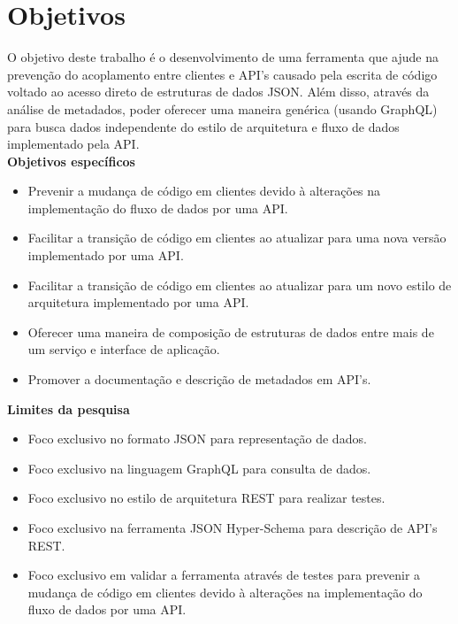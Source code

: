 \section[Objetivos]{Objetivos}

O objetivo deste trabalho é o desenvolvimento de uma ferramenta que ajude na prevenção do acoplamento entre clientes e API's causado pela escrita de código voltado ao acesso direto de estruturas de dados JSON. Além disso, através da análise de metadados, poder oferecer uma maneira genérica (usando GraphQL) para busca dados independente do estilo de arquitetura e fluxo de dados implementado pela API. \\

\textbf{Objetivos específicos} \\

\begin{itemize}
\item Prevenir a mudança de código em clientes devido à alterações na implementação do fluxo de dados por uma API.
\item Facilitar a transição de código em clientes ao atualizar para uma nova versão implementado por uma API.
\item Facilitar a transição de código em clientes ao atualizar para um novo estilo de arquitetura implementado por uma API.
\item Oferecer uma maneira de composição de estruturas de dados entre mais de um serviço e interface de aplicação.
\item Promover a documentação e descrição de metadados em API's. \\
\end{itemize}

\textbf{Limites da pesquisa} \\

\begin{itemize}
\item Foco exclusivo no formato JSON para representação de dados.
\item Foco exclusivo na linguagem GraphQL para consulta de dados.
\item Foco exclusivo no estilo de arquitetura REST para realizar testes.
\item Foco exclusivo na ferramenta JSON Hyper-Schema para descrição de API's REST.
\item Foco exclusivo em validar a ferramenta através de testes para prevenir a mudança de código em clientes devido à alterações na implementação do fluxo de dados por uma API.
\end{itemize}